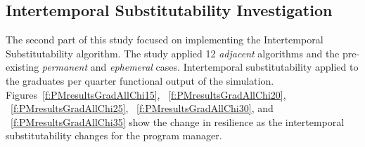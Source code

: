 
\subsection{Intertemporal Substitutability Investigation}

The second part of this study focused on implementing the
Intertemporal Substitutability algorithm. The study applied 12
\emph{adjacent} algorithms and the pre-existing \emph{permanent} and
\emph{ephemeral} cases. Intertemporal substitutability applied to the
graduates per quarter functional output of the
simulation. Figures~\ref{f:PMresultsGradAllChi15}, ~\ref{f:PMresultsGradAllChi20},
~\ref{f:PMresultsGradAllChi25}, ~\ref{f:PMresultsGradAllChi30}, and
~\ref{f:PMresultsGradAllChi35}  show the change in
resilience as the intertemporal substitutability changes for the
program manager.


